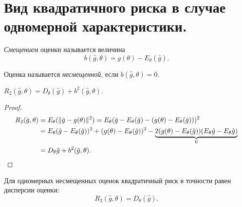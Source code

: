 \section{Вид квадратичного риска в случае одномерной характеристики.}

\begin{definition}
    \textit{Смещением} оценки называется величина
    \[
        b(\hat{g}, \theta) = g(\theta) - E_\theta(\hat{g})
    .\]
\end{definition}

\begin{definition}
    Оценка называется \textit{несмещенной}, если $b(\hat{g}, \theta) = 0$.
\end{definition}

\begin{theorem}
    $R_2(\hat{g}, \theta) = D_\theta(\hat{g}) + b^2(\hat{g}, \theta)$.
\end{theorem}
\begin{proof}
    \begin{align*}
        R_2(\hat{g}, \theta) 
        &= E_\theta(\lVert\hat{g} - g(\theta)\rVert^2) =
        E_\theta(\hat{g} - E_\theta(\hat{g}) - (g(\theta) -
        E_\theta(\hat{g})))^2 \\
        &= E_\theta(\hat{g} - E_\theta(\hat{g}))^2 + (g(\theta) - 
        E_\theta(\hat{g}))^2 - \underbrace{2(g(\theta) - E_\theta(\hat{g}))
        (E_\theta{\hat{g}} - E_\theta{\hat{g}})}_0 \\
        &= D_\theta{\hat{g}} + b^2(\hat{g}, \theta)
    .\end{align*}
\end{proof}

\begin{corollary}
    Для одномерных несмещенных оценок квадратичный риск в точности равен
    дисперсии оценки:
    \[
        R_2(\hat{g}, \theta) = D_\theta(\hat{g})
    .\]
\end{corollary}

